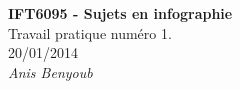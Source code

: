 \begin{titlepage}
    \vspace*{3.5cm}
    \begin{center} 
        \LARGE{ \textbf{IFT6095 - Sujets en infographie} }\\[1cm]
        \Large{Travail pratique numéro 1.}\\
        \normalsize{20/01/2014}\\[1cm]
        \normalsize{ \textit{Anis Benyoub} }
    	\begin{figure}[ht]
	\centering
	\end{figure}
    \end{center}
    
\end{titlepage}